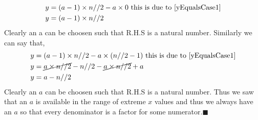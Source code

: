 \documentclass[12pt, twoside]{article}
\begin{document}
\begin{align*}
	y &= (a-1)\times n//2 - a\times 0 \text{ this is due to \eqref{yEqualsCase1}} \\
	y &= (a-1)\times n//2
\end{align*}
Clearly an a can be choosen such that R.H.S is a natural number. Similarly we can say that,
\begin{align*}
	y &= (a-1)\times n//2 - a\times (n//2-1) \text{ this is due to \eqref{yEqualsCase1}} \\
	y &= \cancel{a\times n//2} - n//2 -\cancel{a\times n//2} +a \\	
	y &= a - n//2
\end{align*}
Clearly an \textbf{$a$} can be choosen such that R.H.S is a natural number. Thus we saw that an $a$ is available in the range of extreme $x$ values and thus we always have an \textbf{$a$} so that every denominator is a factor for some numerator.$\blacksquare$
\end{document}
